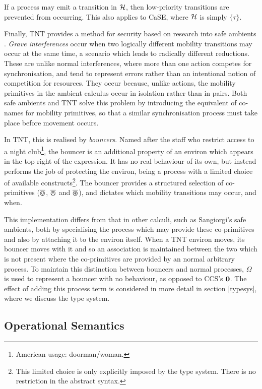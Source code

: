 \documentclass[orivec,envcountsame]{llncs}
\begin{document}
If a process may emit a transition in $\text{$\mathcal{H}$}$, then low-priority
transitions are prevented from occurring.  This also applies to CaSE,
where $\text{$\mathcal{H}$}$ is simply $\{ \tau \}$.

Finally, TNT provides a method for security based on research into
safe ambients \cite{sangiorgi:mobsafeambients}.  \emph{Grave
interferences} occur when two logically different mobility transitions may
occur at the same time, a scenario which leads to radically
different reductions.  These are unlike normal interferences, where more
than one action competes for synchronisation, and tend to represent
errors rather than an intentional notion of competition for resources.
They occur because, unlike actions, the mobility primitives in the
ambient calculus occur in isolation rather than in pairs.  Both safe
ambients and TNT solve this problem by introducing the equivalent of
co-names for mobility primitives, so that a similar synchronisation
process must take place before movement occurs.

In TNT, this is realised by \emph{bouncers}.  Named after the staff who
restrict access to a night club\footnote{American usage:
doorman/woman.}, the bouncer is an additional property of an environ
which appears in the top right of the expression.  It has no real
behaviour of its own, but instead performs the job of protecting the
environ, being a process with a limited choice of available
constructs\footnote{This limited choice is only explicitly imposed by
the type system.  There is no restriction in the abstract syntax.}.  The
bouncer provides a structured selection of co-primitives ($\overline{\varovee}$,
$\overline{\varowedge}$ and $\overline{\varoast}$), and dictates which mobility transitions may
occur, and when.

This implementation differs from that in other calculi, such as
Sangiorgi's safe ambients, both by specialising the process which may provide
these co-primitives and also by attaching it to the environ itself.
When a TNT environ moves, its bouncer moves with it and so an
association is maintained between the two which is not present where the
co-primitives are provided by an normal arbitrary process.  To maintain
this distinction between bouncers and normal processes, $\Omega$ is used
to represent a bouncer with no behaviour, as opposed to CCS's $\textbf{0}$.  The
effect of adding this process term is considered in more detail in section
\ref{typesys}, where we discuss the type system.

\subsection{Operational Semantics}
\end{document}
